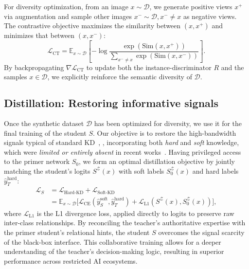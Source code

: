 \begin{foldable} %
  For diversity optimization, from an image $x \sim \mathcal{D}$, we generate positive views $x^{+}$ via augmentation and sample other images $x^{-} \sim \mathcal{D}, x^{-} \neq x$ as negative views.
  The contrastive objective maximizes the similarity between $(x, x^{+})$ and minimizes that between $(x, x^{-})$:
  \begin{equation} \label{eq:loss-contrastive}
    \mathcal{L}_\text{CT} = \mathbb{E}_{x \sim \mathcal{D}} \left[
      -\log \frac{ \exp\left( \text{Sim}(x, x^{+}) \right) }{ \sum_{x^{-} \ne x} \exp\left( \text{Sim}(x, x^{-}) \right) }
    \right].
  \end{equation}
  By backpropagating $\nabla\mathcal{L}_\text{CT}$ to update both the instance-discriminator $R$ and the samples $x \in \mathcal{D}$, we explicitly reinforce the semantic diversity of $\mathcal{D}$.
\end{foldable}

\subsection{Distillation: Restoring informative signals} \label{sec:03-framework-distillation}
\begin{foldable}
  Once the synthetic dataset $\mathcal{D}$ has been optimized for diversity, we use it for the final training of the student $S$.
  Our objective is to restore the high-bandwidth signals typical of standard KD~\cite{hinton2015distilling}, \ie, incorporating both \textit{hard} and \textit{soft} knowledge, which were \textit{limited or entirely absent} in recent works~\cite{wang2021zero, zhang2022ideal, yuan2024data}.
  Having privileged access to the primer network $S_0$, we form an optimal distillation objective by jointly matching the student's logits $S^\mathcal{Z}(x)$ with soft labels $S_{0}^\mathcal{Z}(x)$ and hard labels $\hat{y}_{T}^\text{hard}$:
  \begin{align} \label{eq:loss-kd-total}
    \mathcal{L}_{S}
    &= \mathcal{L}_{\text{Hard-KD}}+\mathcal{L}_{\text{Soft-KD}} \\
    &= \mathbb{E}_{x\sim\mathcal{D}}\Big[\mathcal{L}_{\text{CE}}\left(\hat{y}_{S}^\text{soft},\hat{y}_{T}^\text{hard}\right) + \mathcal{L}_{\text{L1}}\left(S^{\mathcal{Z}}\left(x\right),S_{0}^{\mathcal{Z}}\left(x\right)\right)\Big],
  \end{align}
  where $\mathcal{L}_{\text{L1}}$ is the L1 divergence loss, applied directly to logits to preserve raw inter-class relationships.
  By reconciling the teacher's authoritative expertise with the primer student's relational hints, the student $S$ overcomes the signal scarcity of the black-box interface.
  This collaborative training allows for a deeper understanding of the teacher's decision-making logic, resulting in superior performance across restricted AI ecosystems.
\end{foldable}
